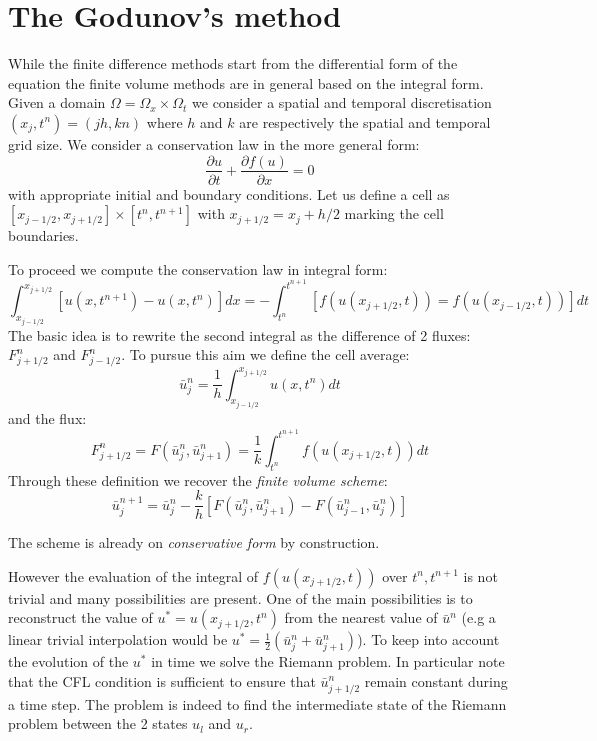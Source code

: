 \documentclass[oneside,12pt]{book}  %
\theoremstyle{plain}
\theoremstyle{definition}
\theoremstyle{remark}
\numberwithin{equation}{chapter} %
\begin{document}
\section{The Godunov's method}
While the finite difference methods start from the differential form
of the equation the finite volume methods are in general based on the
integral form.
Given a domain $\Omega=\Omega_x\times \Omega_t$ we consider a spatial
and temporal discretisation $(x_j,t^n)=(jh,kn)$ where $h$ and $k$ are
respectively the spatial and temporal grid size.
We consider a conservation law in the more general form:
\begin{equation}
  \label{eq:conservation_law}
  \frac{\partial u}{\partial t}+\frac{\partial f(u)}{\partial x}=0
\end{equation}
with appropriate initial and boundary conditions.
Let us define a cell as $[x_{j-1/2},x_{j+1/2}]\times [t^n,t^{n+1}]$
with $x_{j+1/2}=x_j+h/2$ marking the cell boundaries. 

To proceed we compute the conservation law in integral form:
\begin{equation}
  \label{eq:conservation_law_integral_form}
  \int_{x_{j-1/2}}^{x_{j+1/2}}[u(x,t^{n+1})-u(x,t^n)]dx=-\int_{t^n}^{t^{n+1}}[f(u(x_{j+1/2},t))=f(u(x_{j-1/2},t))]dt
\end{equation}
The basic idea is to rewrite the second integral as the difference of
2 fluxes: $F^{n}_{j+1/2}$ and $F^{n}_{j-1/2}$. 
To pursue this aim we define the cell average:
\begin{equation}
  \label{eq:cell_average}
  \bar{u}^{n}_{j}=\frac{1}{h}\int_{x_{j-1/2}}^{x_{j+1/2}}u(x,t^{n})dt
\end{equation}
and the flux:
\begin{equation}
  \label{eq:generic_flux}
  F^{n}_{j+1/2}=F(\bar{u}^{n}_{j},\bar{u}^{n}_{j+1})=\frac{1}{k}\int_{t^n}^{t^{n+1}}f(u(x_{j+1/2},t))dt
\end{equation}
Through these definition we recover the \textit{finite volume scheme}:
\begin{equation}
  \label{eq:generic_finite_volume}
  \bar{u}^{n+1}_{j}=\bar{u}^{n}_{j}-\frac{k}{h}[F(\bar{u}^{n}_{j},\bar{u}^{n}_{j+1})-F(\bar{u}^{n}_{j-1},\bar{u}^{n}_{j})]
\end{equation}

The scheme is already on \textit{conservative form} by construction.

However the evaluation of the integral of $f(u(x_{j+1/2},t))$ over
$t^n,t^{n+1}$ is not trivial and many possibilities are present.
One of the main possibilities is to reconstruct the value of
$u^*=u(x_{j+1/2},t^n)$ from the nearest value of $\bar{u}^n$ (e.g a
linear trivial interpolation would be
$u^*=\frac{1}{2}(\bar{u}^n_j+\bar{u}^n_{j+1})$). To keep into account
the evolution of the $u^*$ in time we solve the Riemann problem. In
particular note that the CFL condition is sufficient to ensure that
$\bar{u}^n_{j+1/2}$ remain constant during a time step. The problem is
indeed to find the intermediate state of the Riemann problem  between
the 2 states $u_l$ and $u_r$.
\end{document}
